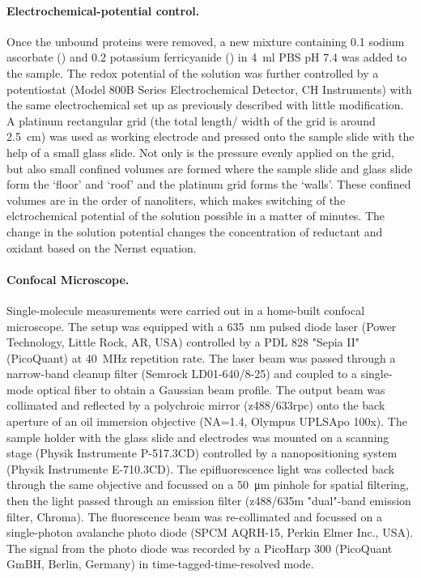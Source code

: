 \paragraph*{Electrochemical-potential control.}
Once the unbound proteins were removed, a new mixture containing \SI{0.1}{\mM} sodium ascorbate () and \SI{0.2}{\mM} potassium ferricyanide (\ce{[Fe(CN)6^3-]}) in \SI{4}{\ml} PBS pH 7.4 was added to the sample.
The redox potential of the solution was further controlled by a potentiostat (Model 800B Series Electrochemical Detector, CH Instruments) with the same electrochemical set up as previously described\cite{zhang2017gold} with little modification.
A platinum rectangular grid (the total length/ width of the grid is around \SI{2.5}{\cm}) was used as working electrode and pressed onto the sample slide with the help of a small glass slide.
Not only is the pressure evenly applied on the grid, but also small confined volumes are formed where the sample slide and glass slide form the `floor' and `roof' and the platinum grid forms the `walls'.
These confined volumes are in the order of nanoliters, which makes switching of the elctrochemical potential of the solution possible in a matter of minutes.
The change in the solution potential changes the concentration of reductant and oxidant based on the Nernst equation.

\paragraph*{Confocal Microscope.}
Single-molecule measurements were carried out in a home-built confocal microscope.
The setup was equipped with a \SI{635}{\nm} pulsed diode laser (Power Technology, Little Rock, AR, USA) controlled by a PDL 828 "Sepia II" (PicoQuant) at \SI{40}{\MHz} repetition rate.
The laser beam was passed through a narrow-band cleanup filter (Semrock LD01-640/8-25) and coupled to a single-mode optical fiber to obtain a Gaussian beam profile.
The output beam was collimated and reflected by a polychroic mirror (z488/633rpc) onto the back aperture of an oil immersion objective (NA=1.4, Olympus UPLSApo 100x).
The sample holder with the glass slide and electrodes was mounted on a scanning stage (Physik Instrumente P-517.3CD) controlled by a nanopositioning system (Physik Instrumente E-710.3CD). 
The epifluorescence light was collected back through the same objective and focussed on a \SI{50}{\um} pinhole for spatial filtering, then the light passed through an emission filter (z488/635m "dual"-band emission filter, Chroma). 
The fluorescence beam was re-collimated and focussed on a single-photon avalanche photo diode (SPCM AQRH-15, Perkin Elmer Inc., USA).
The signal from the photo diode was recorded by a PicoHarp 300 (PicoQuant GmBH, Berlin, Germany) in time-tagged-time-resolved mode.


